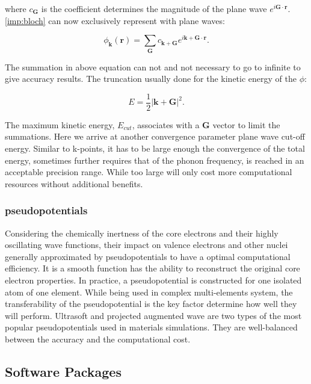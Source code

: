 where $c_{\mathbf{G}}$ is the coefficient determines the magnitude of the plane wave $e^{i\mathbf{G}\cdot\mathbf{r}}$. \autoref{imp:bloch} can now exclusively represent with plane waves:

\begin{equation}
\phi_{\mathbf{k}}(\mathbf{r})=\sum_{\mathbf{G}}c_{\mathbf{k+G}}e^{i\mathbf{k+G}\cdot\mathbf{r}}.
\end{equation}

The summation in above equation can not and not necessary to go to infinite to give accuracy results. The truncation usually done for the kinetic energy of the $\phi$:

\begin{equation}
E=\frac{1}{2}|\mathbf{k+G}|^2.
\end{equation}

The maximum kinetic energy, $E_{cut}$, associates with a $\mathbf{G}$ vector to limit the summations. Here we arrive at another convergence parameter plane wave cut-off energy. Similar to k-points, it has to be large enough the convergence of the total energy, sometimes further requires that of the phonon frequency, is reached in an acceptable precision range.  While too large will only cost more computational resources without additional benefits.

\subsubsection{pseudopotentials}

Considering the chemically inertness of the core electrons and their highly oscillating wave functions, their impact on valence electrons and other nuclei generally approximated by pseudopotentials to have a optimal computational efficiency. It is a smooth function has the ability to reconstruct the original core electron properties. In practice, a pseudopotential is constructed for one isolated atom of one element. While being used in complex multi-elements system, the transferability of the pseudopotential is the key factor determine how well they will perform. Ultrasoft \cite{Vanderbilt1990} and projected augmented wave \cite{bloch1994,Kresse1999} are two types of the most popular pseudopotentials used in materials simulations. They are well-balanced between the accuracy and the computational cost. 

\subsection{Software Packages}

